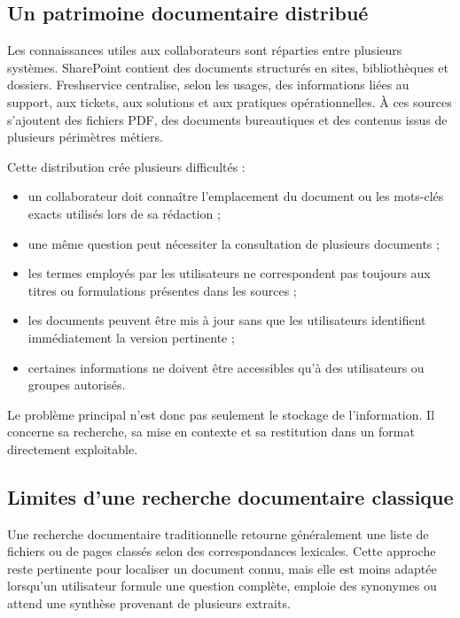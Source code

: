 \subsection{Un patrimoine documentaire distribué}

Les connaissances utiles aux collaborateurs sont réparties entre plusieurs systèmes. SharePoint contient des documents structurés en sites, bibliothèques et dossiers. Freshservice centralise, selon les usages, des informations liées au support, aux tickets, aux solutions et aux pratiques opérationnelles. À ces sources s'ajoutent des fichiers PDF, des documents bureautiques et des contenus issus de plusieurs périmètres métiers.

Cette distribution crée plusieurs difficultés :

\begin{itemize}
    \item un collaborateur doit connaître l'emplacement du document ou les mots-clés exacts utilisés lors de sa rédaction ;
    \item une même question peut nécessiter la consultation de plusieurs documents ;
    \item les termes employés par les utilisateurs ne correspondent pas toujours aux titres ou formulations présentes dans les sources ;
    \item les documents peuvent être mis à jour sans que les utilisateurs identifient immédiatement la version pertinente ;
    \item certaines informations ne doivent être accessibles qu'à des utilisateurs ou groupes autorisés.
\end{itemize}

Le problème principal n'est donc pas seulement le stockage de l'information. Il concerne sa recherche, sa mise en contexte et sa restitution dans un format directement exploitable.

\subsection{Limites d'une recherche documentaire classique}

Une recherche documentaire traditionnelle retourne généralement une liste de fichiers ou de pages classés selon des correspondances lexicales. Cette approche reste pertinente pour localiser un document connu, mais elle est moins adaptée lorsqu'un utilisateur formule une question complète, emploie des synonymes ou attend une synthèse provenant de plusieurs extraits.

